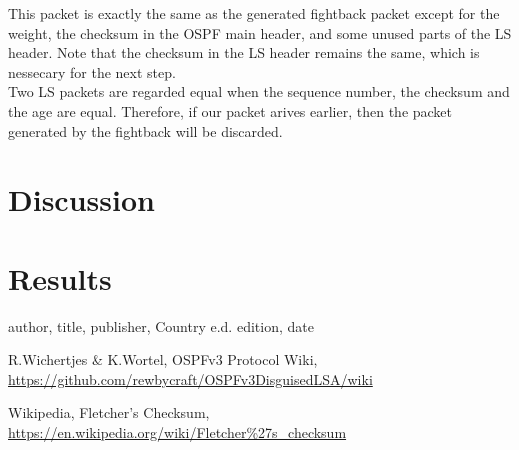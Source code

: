 \documentclass[11pt,a4paper,oneside]{article}
\newcommand{\lsection}[2]{\section{#1}\label{sec:#2}}
\begin{document}
    			
    			
    			This packet is exactly the same as the generated fightback packet except for the weight, the checksum in the OSPF main header, and some unused parts of the LS header. Note that the checksum in the LS header remains the same, which is nessecary for the next step.\\
    			Two LS packets are regarded equal when the sequence number, the checksum and the age are equal. Therefore, if our packet arives earlier, then the packet generated by the fightback will be discarded.\\
    		
    		
    \lsection{Discussion}{discussion}
    		
    		
    		
    \lsection{Results}{results}
    		
    
    
    \begin{thebibliography}{999}
author,
title,
publisher,
Country e.d.
edition,
date

R.Wichertjes \& K.Wortel,
OSPFv3 Protocol Wiki,
\url{https://github.com/rewbycraft/OSPFv3DisguisedLSA/wiki}

Wikipedia,
Fletcher's Checksum,
\url{https://en.wikipedia.org/wiki/Fletcher\%27s_checksum}




    \end{thebibliography}
\end{document}
